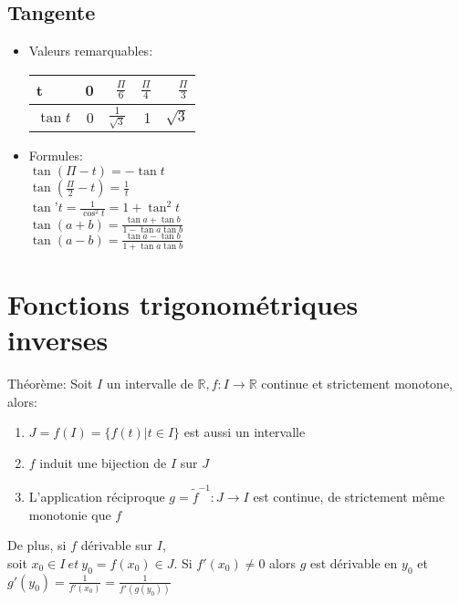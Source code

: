 \documentclass[fleqn]{article}
\begin{document}
\subsection{Tangente}
\begin{itemize}
	\item Valeurs remarquables: \\
	\begin{tabular}{lrrrr}
		\toprule
		t        & 0 & $\frac{\Pi}{6}$      & $\frac{\Pi}{4}$ & $\frac{\Pi}{3}$ \\
		\hline
		$\tan t$ & 0 & $\frac{1}{\sqrt{3}}$ & 1               & $\sqrt{3}$ \\
		\bottomrule
	\end{tabular}

	\item Formules: \\
	$\tan (\Pi-t) = -\tan t$ \\
	$\tan (\frac{\Pi}{2} - t) = \frac{1}{t} $ \\
	\newline
	$\tan$'$ t = \frac{1}{\cos^2 t} = 1 + \tan^2 t$ \\
	$\tan (a+b) = \frac{\tan a + \tan b}{1 - \tan a\tan b}$ \\
	$\tan (a-b) = \frac{\tan a - \tan b}{1 + \tan a\tan b}$ \\
\end{itemize}

\section{Fonctions trigonom\'etriques inverses}
Th\'eor\`eme: Soit \(I\) un intervalle de \(\mathbb{R}, f: I \rightarrow \mathbb{R}\) continue et strictement monotone, alors:
\begin{enumerate}
	\item \(J = f(I) = \{f(t)|t \in I\}\) est aussi un intervalle
	\item \(f\) induit une bijection de \(I\) sur \(J\)
	\item L'application r\'eciproque \(g = \tilde{f}^{-1}:J \rightarrow I\) est continue, de strictement m\^eme monotonie que \(f\)
\end{enumerate}
De plus, si \(f\) d\'erivable sur \(I\), \\
soit \(x_0 \in I\ et\ y_0 = f(x_0) \in J\). Si \(f'(x_0) \neq 0 \) alors \(g\) est d\'erivable en \(y_0\) et
\(g'(y_0) = \frac{1}{f'(x_0)} = \frac{1}{f'(g(y_0))}\) \\
\end{document}
